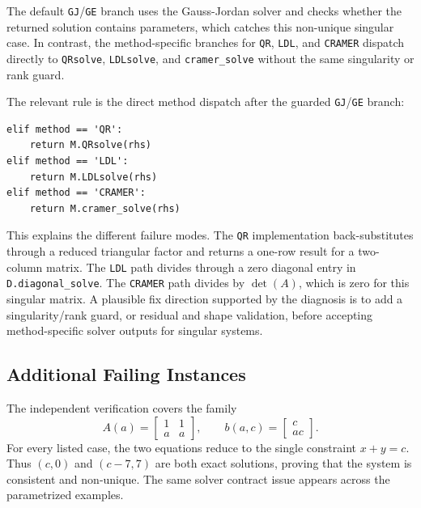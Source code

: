 \documentclass[11pt]{article}
\begin{document}
The default \texttt{GJ}/\texttt{GE} branch uses the Gauss-Jordan solver and checks whether the returned solution contains parameters, which catches this non-unique singular case. In contrast, the method-specific branches for \texttt{QR}, \texttt{LDL}, and \texttt{CRAMER} dispatch directly to \texttt{QRsolve}, \texttt{LDLsolve}, and \texttt{cramer\_solve} without the same singularity or rank guard.

The relevant rule is the direct method dispatch after the guarded \texttt{GJ}/\texttt{GE} branch:

\begin{lstlisting}[style=bugpython]
elif method == 'QR':
    return M.QRsolve(rhs)
elif method == 'LDL':
    return M.LDLsolve(rhs)
elif method == 'CRAMER':
    return M.cramer_solve(rhs)
\end{lstlisting}

This explains the different failure modes. The \texttt{QR} implementation back-substitutes through a reduced triangular factor and returns a one-row result for a two-column matrix. The \texttt{LDL} path divides through a zero diagonal entry in \texttt{D.diagonal\_solve}. The \texttt{CRAMER} path divides by \(\det(A)\), which is zero for this singular matrix. A plausible fix direction supported by the diagnosis is to add a singularity/rank guard, or residual and shape validation, before accepting method-specific solver outputs for singular systems.

\subsection{Additional Failing Instances}

The independent verification covers the family
\[
A(a)=\begin{bmatrix}1&1\\ a&a\end{bmatrix},\qquad
b(a,c)=\begin{bmatrix}c\\ ac\end{bmatrix}.
\]
For every listed case, the two equations reduce to the single constraint \(x+y=c\). Thus \((c,0)\) and \((c-7,7)\) are both exact solutions, proving that the system is consistent and non-unique. The same solver contract issue appears across the parametrized examples.
\end{document}
